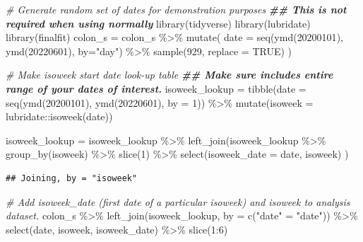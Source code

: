 \documentclass[
]{book}
\newenvironment{Shaded}{\begin{snugshade}}{\end{snugshade}}
\newcommand{\AttributeTok}[1]{\textcolor[rgb]{0.77,0.63,0.00}{#1}}
\newcommand{\CommentTok}[1]{\textcolor[rgb]{0.56,0.35,0.01}{\textit{#1}}}
\newcommand{\ConstantTok}[1]{\textcolor[rgb]{0.00,0.00,0.00}{#1}}
\newcommand{\DecValTok}[1]{\textcolor[rgb]{0.00,0.00,0.81}{#1}}
\newcommand{\DocumentationTok}[1]{\textcolor[rgb]{0.56,0.35,0.01}{\textbf{\textit{#1}}}}
\newcommand{\FunctionTok}[1]{\textcolor[rgb]{0.00,0.00,0.00}{#1}}
\newcommand{\NormalTok}[1]{#1}
\newcommand{\OtherTok}[1]{\textcolor[rgb]{0.56,0.35,0.01}{#1}}
\newcommand{\SpecialCharTok}[1]{\textcolor[rgb]{0.00,0.00,0.00}{#1}}
\newcommand{\StringTok}[1]{\textcolor[rgb]{0.31,0.60,0.02}{#1}}
\begin{document}
\begin{Shaded}
\begin{Highlighting}[]
\CommentTok{\# Generate random set of dates for demonstration purposes}
\DocumentationTok{\#\# This is not required when using normally}
\FunctionTok{library}\NormalTok{(tidyverse)}
\FunctionTok{library}\NormalTok{(lubridate)}
\FunctionTok{library}\NormalTok{(finalfit)}
\NormalTok{colon\_s }\OtherTok{=}\NormalTok{ colon\_s }\SpecialCharTok{\%\textgreater{}\%} 
  \FunctionTok{mutate}\NormalTok{(}
    \AttributeTok{date =} \FunctionTok{seq}\NormalTok{(}\FunctionTok{ymd}\NormalTok{(}\DecValTok{20200101}\NormalTok{), }\FunctionTok{ymd}\NormalTok{(}\DecValTok{20220601}\NormalTok{), }\AttributeTok{by=}\StringTok{"day"}\NormalTok{) }\SpecialCharTok{\%\textgreater{}\%} 
      \FunctionTok{sample}\NormalTok{(}\DecValTok{929}\NormalTok{, }\AttributeTok{replace =} \ConstantTok{TRUE}\NormalTok{)}
\NormalTok{  )}
    
\CommentTok{\# Make isoweek start date look{-}up table}
\DocumentationTok{\#\# Make sure includes entire range of your dates of interest. }
\NormalTok{isoweek\_lookup }\OtherTok{=} \FunctionTok{tibble}\NormalTok{(}\AttributeTok{date =} \FunctionTok{seq}\NormalTok{(}\FunctionTok{ymd}\NormalTok{(}\DecValTok{20200101}\NormalTok{), }\FunctionTok{ymd}\NormalTok{(}\DecValTok{20220601}\NormalTok{), }\AttributeTok{by =} \DecValTok{1}\NormalTok{)) }\SpecialCharTok{\%\textgreater{}\%} 
  \FunctionTok{mutate}\NormalTok{(}\AttributeTok{isoweek =}\NormalTok{ lubridate}\SpecialCharTok{::}\FunctionTok{isoweek}\NormalTok{(date))}

\NormalTok{isoweek\_lookup }\OtherTok{=}\NormalTok{ isoweek\_lookup }\SpecialCharTok{\%\textgreater{}\%} 
  \FunctionTok{left\_join}\NormalTok{(isoweek\_lookup }\SpecialCharTok{\%\textgreater{}\%} 
  \FunctionTok{group\_by}\NormalTok{(isoweek) }\SpecialCharTok{\%\textgreater{}\%} 
  \FunctionTok{slice}\NormalTok{(}\DecValTok{1}\NormalTok{) }\SpecialCharTok{\%\textgreater{}\%} 
  \FunctionTok{select}\NormalTok{(}\AttributeTok{isoweek\_date =}\NormalTok{ date, isoweek)}
\NormalTok{  )}
\end{Highlighting}
\end{Shaded}

\begin{verbatim}
## Joining, by = "isoweek"
\end{verbatim}

\begin{Shaded}
\begin{Highlighting}[]
\CommentTok{\# Add isoweek\_date (first date of a particular isoweek) and isoweek to analysis dataset. }
\NormalTok{colon\_s }\SpecialCharTok{\%\textgreater{}\%} 
  \FunctionTok{left\_join}\NormalTok{(isoweek\_lookup, }\AttributeTok{by =} \FunctionTok{c}\NormalTok{(}\StringTok{"date"} \OtherTok{=} \StringTok{"date"}\NormalTok{)) }\SpecialCharTok{\%\textgreater{}\%} 
  \FunctionTok{select}\NormalTok{(date, isoweek, isoweek\_date) }\SpecialCharTok{\%\textgreater{}\%} 
  \FunctionTok{slice}\NormalTok{(}\DecValTok{1}\SpecialCharTok{:}\DecValTok{6}\NormalTok{)}
\end{Highlighting}
\end{Shaded}
\end{document}
